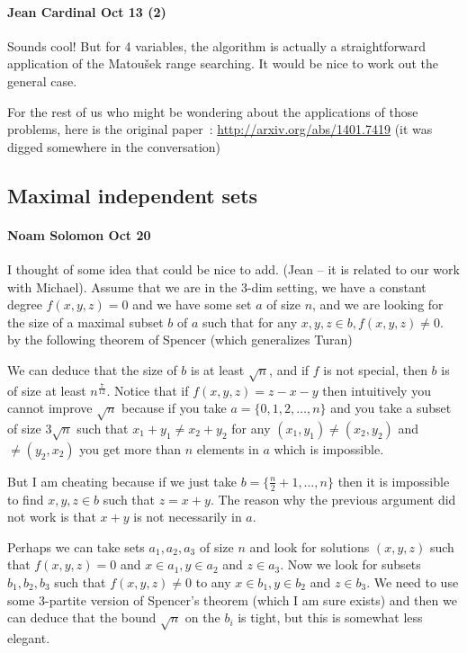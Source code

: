 \paragraph{Jean Cardinal Oct 13 (2)}
Sounds cool!
But for 4 variables, the algorithm is actually a straightforward
application of the Matou\v{s}ek range searching.
It would be nice to work out the general case.

For the rest of us who might be wondering about the applications of those
problems, here is the original paper~\cite{RSS14}:
\url{http://arxiv.org/abs/1401.7419}
(it was digged somewhere in the conversation)


\subsection{Maximal independent sets}
\paragraph{Noam Solomon Oct 20}
I thought of some idea that could be nice to add. (Jean -- it is related to
our work with Michael).
Assume that we are in the 3-dim setting, we have a constant degree
$f(x,y,z)=0$ and we have some set $a$ of size $n$, and we are looking for the
size of a maximal subset $b$ of $a$ such that for any $x,y,z \in b, f(x,y,z) \ne
0$.
by the following theorem of Spencer (which generalizes Turan)

We can deduce that the size of $b$ is at least $\sqrt n$, and if $f$ is not
special, then $b$ is of size at least $n^{\frac{7}{12}}$. Notice that if
$f(x,y,z)=z-x-y$ then intuitively you cannot improve $\sqrt n$ because if you
take $a=\{0,1,2,\ldots,n\}$ and you take a subset of size $3\sqrt n$ such that
$x_1+y_1 \ne x_2+y_2$ for any $(x_1,y_1) \ne (x_2,y_2)$ and $\ne (y_2,x_2)$
you get more than $n$ elements in $a$ which is impossible.

But I am cheating because if we just take
$b=\{\frac{n}{2}+1,\ldots,n\}$ then it is
impossible to find $x,y,z \in b$ such that $z=x+y$. The reason why the previous
argument did not work is that $x+y$ is not necessarily in $a$.

Perhaps we can take sets $a_1, a_2, a_3$ of size $n$ and look for solutions
$(x,y,z)$ such that $f(x,y,z)=0$ and
$x\in a_1, y\in a_2$ and $z\in a_3$. Now we look for subsets $b_1,b_2, b_3$ such
that
$f(x,y,z) \ne 0$ to any $x\in b_1, y\in b_2$ and $z\in b_3$. We need to use some
3-partite version of Spencer's theorem (which I am sure exists) and then we
can deduce that the bound $\sqrt n$ on the $b_i$ is tight, but this is somewhat
less elegant.

